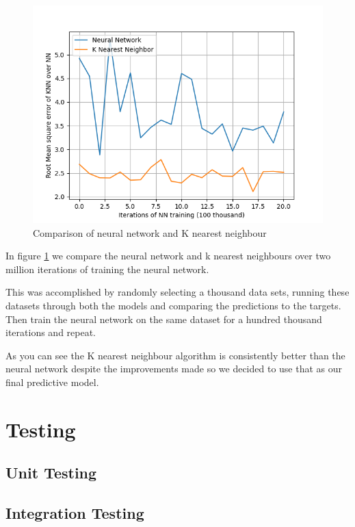 \documentclass[11pt]{article}
\begin{document}
	\begin{figure}[!htb]
		\begin{center}
			\includegraphics{Resources/PartTwo/Comparison_20220112_152958.png}
			\caption{Comparison of neural network and K nearest neighbour}
			\label{Img:NNKNNComp}
		\end{center}
	\end{figure}
	
	In figure \ref{Img:NNKNNComp} we compare the neural network and k nearest neighbours over two million iterations of training the neural network.
	
	This was accomplished by randomly selecting a thousand data sets, running these datasets through both the models and comparing the predictions to the targets. Then train the neural network on the same dataset for a hundred thousand iterations and repeat.
	
	As you can see the K nearest neighbour algorithm is consistently better than the neural network despite the improvements made so we decided to use that as our final predictive model.
	
	\section{Testing}
	
	\subsection{Unit Testing}
	
	\subsection{Integration Testing}
	
\end{document}

